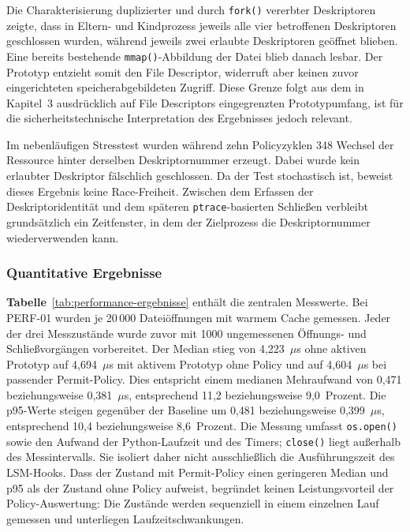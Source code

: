 Die Charakterisierung duplizierter und durch \texttt{fork()} vererbter Deskriptoren zeigte, dass
in Eltern- und Kindprozess jeweils alle vier betroffenen Deskriptoren geschlossen wurden, während
jeweils zwei erlaubte Deskriptoren geöffnet blieben. Eine bereits bestehende
\texttt{mmap()}-Abbildung der Datei blieb danach lesbar. Der Prototyp entzieht somit den File
Descriptor, widerruft aber keinen zuvor eingerichteten speicherabgebildeten Zugriff. Diese Grenze
folgt aus dem in Kapitel~3 ausdrücklich auf File Descriptors eingegrenzten Prototypumfang, ist
für die sicherheitstechnische Interpretation des Ergebnisses jedoch relevant.

Im nebenläufigen Stresstest wurden während zehn Policyzyklen 348 Wechsel der Ressource hinter
derselben Deskriptornummer erzeugt. Dabei wurde kein erlaubter Deskriptor fälschlich geschlossen.
Da der Test stochastisch ist, beweist dieses Ergebnis keine Race-Freiheit. Zwischen dem Erfassen
der Deskriptoridentität und dem späteren \texttt{ptrace}-basierten Schließen verbleibt grundsätzlich
ein Zeitfenster, in dem der Zielprozess die Deskriptornummer wiederverwenden kann.

\subsubsection{Quantitative Ergebnisse}



\textbf{Tabelle}~\ref{tab:performance-ergebnisse} enthält die zentralen Messwerte. Bei PERF-01 wurden je
20\,000 Dateiöffnungen mit warmem Cache gemessen. Jeder der drei Messzustände wurde zuvor
mit 1000 ungemessenen Öffnungs- und Schließvorgängen vorbereitet. Der Median stieg von
4,223~$\mu$s ohne aktiven Prototyp auf 4,694~$\mu$s mit aktivem Prototyp ohne Policy und auf
4,604~$\mu$s bei passender Permit-Policy. Dies entspricht einem medianen Mehraufwand von
0,471 beziehungsweise 0,381~$\mu$s, entsprechend 11,2 beziehungsweise 9,0~Prozent.
Die p95-Werte steigen gegenüber der Baseline um 0,481 beziehungsweise 0,399~$\mu$s,
entsprechend 10,4 beziehungsweise 8,6~Prozent. Die Messung umfasst \texttt{os.open()} sowie den Aufwand der
Python-Laufzeit und des Timers; \texttt{close()} liegt außerhalb des Messintervalls. Sie isoliert
daher nicht ausschließlich die Ausführungszeit des LSM-Hooks. Dass der Zustand mit Permit-Policy
einen geringeren Median und p95 als der Zustand ohne Policy aufweist, begründet keinen
Leistungsvorteil der Policy-Auswertung: Die Zustände werden sequenziell in einem einzelnen Lauf
gemessen und unterliegen Laufzeitschwankungen.

